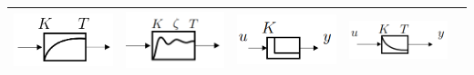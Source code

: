 \documentclass[margin=normal]{tex/hsrzf}
\begin{document}
\begin{tabular}{|c|c|c|c|c|}
      \includegraphics[width = 3cm]{img/PT1-Glied.png}         &
      \includegraphics[width = 3cm]{img/PT2-Glied.png}         &
      \includegraphics[width = 3cm]{img/D-Glied.png}           &
      \includegraphics[width = 3cm]{img/DT-Glied.png}            \\
      \hline
\end{tabular}
\end{document}

